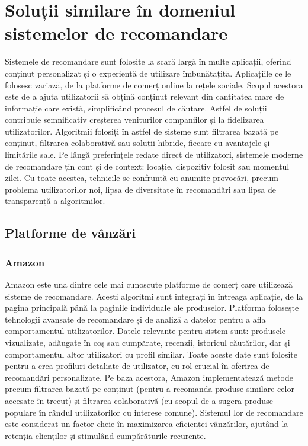 \chapter{Soluții similare în domeniul sistemelor de recomandare}
\label{chap:ch2}

Sistemele de recomandare sunt folosite la scară largă în multe aplicații, oferind conținut personalizat și o experientă de utilizare îmbunătățită. 
Aplicațiile ce le folosesc variază, de la platforme de comerț online la rețele sociale.
Scopul acestora este de a ajuta utilizatorii să obțină conținut relevant din cantitatea mare de informație care există, simplificând procesul de căutare.
Astfel de soluții contribuie semnificativ creșterea veniturilor companiilor și la fidelizarea utilizatorilor.
Algoritmii folosiți în astfel de sisteme sunt filtrarea bazată pe conținut, filtrarea colaborativă sau soluții hibride, fiecare cu avantajele și limitările sale.
Pe lângă preferințele redate direct de utilizatori, sistemele moderne de recomandare țin cont și de context: locație, dispozitiv folosit sau momentul zilei.
Cu toate acestea, tehnicile se confruntă cu anumite provocări, precum problema utilizatorilor noi, lipsa de diversitate în recomandări sau lipsa de transparență a algoritmilor.

\section{Platforme de vânzări}
\label{sec:ch2sec1}
\subsection*{Amazon}
Amazon este una dintre cele mai cunoscute platforme de comerț care utilizează sisteme de recomandare.
Acesti algoritmi sunt integrați în întreaga aplicație, de la pagina principală până la paginile individuale ale produselor.
Platforma folosește tehnologii avansate de recomandare și de analiză a datelor pentru a afla comportamentul utilizatorilor.
Datele relevante pentru sistem sunt: produsele vizualizate, adăugate în coș sau cumpărate, recenzii, istoricul căutărilor, dar și comportamentul altor utilizatori cu profil similar. 
Toate aceste date sunt folosite pentru a crea profiluri detaliate de utilizator, cu rol crucial în oferirea de recomandări personalizate.
Pe baza acestora, Amazon implementatează metode precum filtrarea bazată pe conținut (pentru a recomanda produse similare celor accesate în trecut) și filtrarea colaborativă (cu scopul de a sugera produse populare în rândul utilizatorilor cu interese comune).
Sistemul lor de recomandare este considerat un factor cheie în maximizarea eficienței vânzărilor, ajutând la retenția clienților și stimulând cumpărăturile recurente\cite{smith2017two, ahmed2022amazon}.


